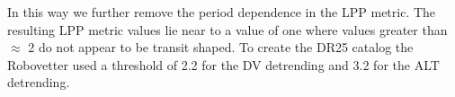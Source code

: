 In this way we further remove the period dependence in the LPP metric.  The resulting LPP metric values lie near to a value of one where values greater than $\approx$ 2 do not appear to be transit shaped.  To create the DR25 catalog the Robovetter used a threshold of 2.2 for the DV detrending and 3.2 for the ALT detrending.






